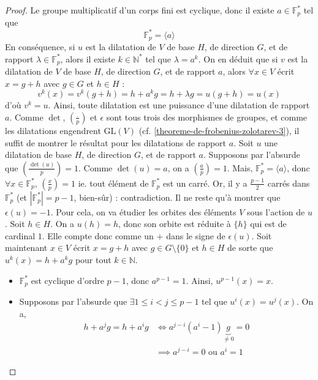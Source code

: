   \begin{proof}
    Le groupe multiplicatif d'un corps fini est cyclique, donc il existe $a \in \mathbb{F}_p^*$ tel que
    \[ \mathbb{F}_p^* = \langle a \rangle \]
    En conséquence, si $u$ est la dilatation de $V$ de base $H$, de direction $G$, et de rapport $\lambda \in \mathbb{F}_p^*$, alors il existe $k \in \mathbb{N}^*$ tel que $\lambda = a^k$. On en déduit que si $v$ est la dilatation de $V$ de base $H$, de direction $G$, et de rapport $a$, alors $\forall x \in V$ écrit $x = g + h$ avec $g \in G$ et $h \in H$ :
    \[ v^k(x) = v^k(g+h) = h + a^k g = h + \lambda g = u(g+h) = u(x) \]
    d'où $v^k = u$. Ainsi, toute dilatation est une puissance d'une dilatation de rapport $a$.
    \newpar
    Comme $\det$, $\left( \frac{.}{p} \right)$ et $\epsilon$ sont tous trois des morphismes de groupes, et comme les dilatations engendrent $\mathrm{GL}(V)$ (cf. \cref{theoreme-de-frobenius-zolotarev-3}), il suffit de montrer le résultat pour les dilatations de rapport $a$.
    \newpar
    Soit $u$ une dilatation de base $H$, de direction $G$, et de rapport $a$. Supposons par l'absurde que $\left( \frac{\det(u)}{p} \right) = 1$. Comme $\det(u) = a$, on a $\left( \frac{a}{p} \right) = 1$. Mais, $\mathbb{F}_p^* = \langle a \rangle$, donc $\forall x \in \mathbb{F}_p^*$, $\left( \frac{x}{p} \right) = 1$ ie. tout élément de $\mathbb{F}_p^*$ est un carré. Or, il y a $\frac{p-1}{2}$ carrés dans $\mathbb{F}_p^*$ (et $|\mathbb{F}_p^*| = p-1$, bien-sûr) : contradiction.
    \newpar
    Il ne reste qu'à montrer que $\epsilon(u) = -1$. Pour cela, on va étudier les orbites des éléments $V$ sous l'action de $u$.
    \newpar
    Soit $h \in H$. On a $u(h) = h$, donc son orbite est réduite à $\{ h \}$ qui est de cardinal $1$. Elle compte donc comme un $+$ dans le signe de $\epsilon(u)$.
    \newpar
    Soit maintenant $x \in V$ écrit $x = g + h$ avec $g \in G \setminus \{ 0 \}$ et $h \in H$ de sorte que $u^k (x) = h + a^k g$ pour tout $k \in \mathbb{N}$.
    \begin{itemize}
      \item $\mathbb{F}_p^*$ est cyclique d'ordre $p-1$, donc $a^{p-1} = 1$. Ainsi, $u^{p-1} (x) = x$.
      \item Supposons par l'absurde que $\exists 1 \leq i < j \leq p-1$ tel que $u^i(x) = u^j(x)$. On a,
      \begin{align*}
        h + a^j g = h + a^i g &\iff a^{j-i} (a^i - 1) \underbrace{g}_{\neq 0} = 0 \\
        &\implies a^{j-i} = 0 \text{ ou } a^i = 1
      \end{align*}

\end{itemize}
\end{proof}
